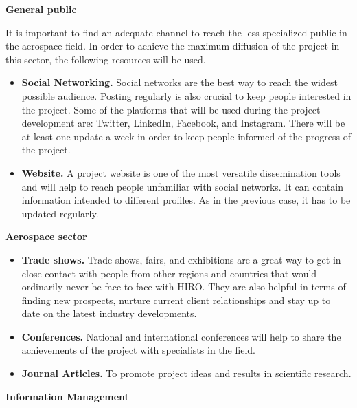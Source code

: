 \textbf{General public}

It is important to find an adequate channel to reach the less specialized public in the aerospace field. In order to achieve the maximum diffusion of the project in this sector,  the following resources will be used.

\begin{itemize}
	\item{\textbf{Social Networking.} Social networks are the best way to reach the widest possible audience. Posting regularly is also crucial to keep people interested in the project. Some of the platforms that will be used during the project development are: Twitter, LinkedIn, Facebook, and Instagram. There will be at least one update a week in order to keep people informed of the progress of the project.}
	\item{\textbf{Website.} A project website is one of the most versatile dissemination tools and will help to reach people unfamiliar with social networks. It can contain information intended to different profiles. As in the previous case, it has to be updated regularly.}
\end{itemize}

\textbf{Aerospace sector}

\begin{itemize}
	\item{\textbf{Trade shows.} Trade shows, fairs, and exhibitions are a great way to get in close contact with people from other regions and countries that would ordinarily never be face to face with HIRO. They are also helpful in terms of finding new prospects, nurture current client relationships and stay up to date on the latest industry developments.}
	\item{\textbf{Conferences.} National and international conferences will help to share the achievements of the project with specialists in the field.}
	\item {\textbf{Journal Articles.} To promote project ideas and results in scientific research.}
\end{itemize}

\pagebreak
\textbf{Information Management}

